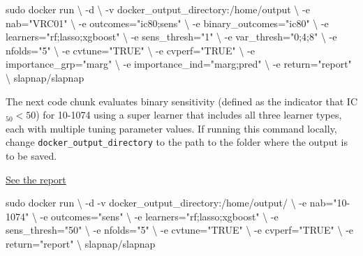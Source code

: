 \documentclass[]{article}
\newenvironment{Shaded}{\begin{snugshade}}{\end{snugshade}}
\newcommand{\StringTok}[1]{\textcolor[rgb]{0.31,0.60,0.02}{#1}}
\newcommand{\FunctionTok}[1]{\textcolor[rgb]{0.00,0.00,0.00}{#1}}
\newcommand{\ExtensionTok}[1]{#1}
\newcommand{\NormalTok}[1]{#1}
\begin{document}
\begin{Shaded}
\begin{Highlighting}[]
\FunctionTok{sudo}\NormalTok{ docker run \textbackslash{}}
\NormalTok{    -d \textbackslash{}}
\NormalTok{    -v docker_output_directory:/home/output \textbackslash{}}
\NormalTok{    -e nab=}\StringTok{"VRC01"}\NormalTok{ \textbackslash{}}
\NormalTok{    -e outcomes=}\StringTok{"ic80;sens"}\NormalTok{ \textbackslash{}}
\NormalTok{    -e binary_outcomes=}\StringTok{"ic80"}\NormalTok{ \textbackslash{}}
\NormalTok{    -e learners=}\StringTok{"rf;lasso;xgboost"}\NormalTok{ \textbackslash{}}
\NormalTok{    -e sens_thresh=}\StringTok{"1"}\NormalTok{ \textbackslash{}}
\NormalTok{    -e var_thresh=}\StringTok{"0;4;8"}\NormalTok{ \textbackslash{}}
\NormalTok{    -e nfolds=}\StringTok{"5"}\NormalTok{ \textbackslash{}}
\NormalTok{    -e cvtune=}\StringTok{"TRUE"}\NormalTok{ \textbackslash{}}
\NormalTok{    -e cvperf=}\StringTok{"TRUE"}\NormalTok{ \textbackslash{}}
\NormalTok{    -e importance_grp=}\StringTok{"marg"}\NormalTok{ \textbackslash{}}
\NormalTok{    -e importance_ind=}\StringTok{"marg;pred"}\NormalTok{ \textbackslash{}}
\NormalTok{    -e return=}\StringTok{"report"}\NormalTok{ \textbackslash{}}
\NormalTok{    slapnap/slapnap}
\end{Highlighting}
\end{Shaded}

The next code chunk evaluates binary sensitivity (defined as the
indicator that IC\(_{50} < 50\)) for 10-1074 using a super learner that
includes all three learner types, each with multiple tuning parameter
values. If running this command locally, change
\texttt{docker\_output\_directory} to the path to the folder where the
output is to be saved.

\href{reports/report_10-1074.html}{See the report}

\begin{Shaded}
\begin{Highlighting}[]
\FunctionTok{sudo}\NormalTok{ docker run \textbackslash{}}
\NormalTok{    -d}
    \ExtensionTok{-v}\NormalTok{ docker_output_directory:/home/output/ \textbackslash{}}
\NormalTok{    -e nab=}\StringTok{"10-1074"}\NormalTok{ \textbackslash{}}
\NormalTok{    -e outcomes=}\StringTok{"sens"}\NormalTok{ \textbackslash{}}
\NormalTok{    -e learners=}\StringTok{"rf;lasso;xgboost"}\NormalTok{ \textbackslash{}}
\NormalTok{    -e sens_thresh=}\StringTok{"50"}\NormalTok{ \textbackslash{}}
\NormalTok{    -e nfolds=}\StringTok{"5"}\NormalTok{ \textbackslash{}}
\NormalTok{    -e cvtune=}\StringTok{"TRUE"}\NormalTok{ \textbackslash{}}
\NormalTok{    -e cvperf=}\StringTok{"TRUE"}\NormalTok{ \textbackslash{}}
\NormalTok{    -e return=}\StringTok{"report"}\NormalTok{ \textbackslash{}}
\NormalTok{    slapnap/slapnap}
\end{Highlighting}
\end{Shaded}
\end{document}

